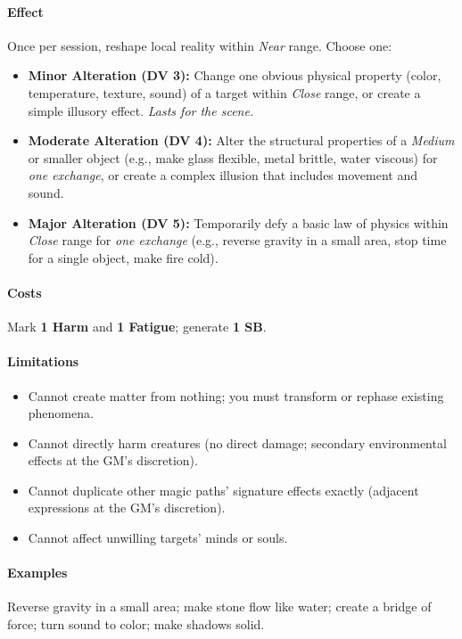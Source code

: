 \documentclass[11pt,twoside]{article}
\begin{document}
\paragraph*{Effect} Once per session, reshape local reality within \emph{Near} range. Choose one:
\begin{itemize}
  \item \textbf{Minor Alteration (DV 3):} Change one obvious physical property (color, temperature, texture, sound) of a target within \emph{Close} range, or create a simple illusory effect. \emph{Lasts for the scene.}
  \item \textbf{Moderate Alteration (DV 4):} Alter the structural properties of a \emph{Medium} or smaller object (e.g., make glass flexible, metal brittle, water viscous) for \emph{one exchange}, or create a complex illusion that includes movement and sound.
  \item \textbf{Major Alteration (DV 5):} Temporarily defy a basic law of physics within \emph{Close} range for \emph{one exchange} (e.g., reverse gravity in a small area, stop time for a single object, make fire cold).
\end{itemize}

\paragraph*{Costs} Mark \textbf{1 Harm} and \textbf{1 Fatigue}; generate \textbf{1 SB}.

\paragraph*{Limitations}
\begin{itemize}
  \item Cannot create matter from nothing; you must transform or rephase existing phenomena.
  \item Cannot directly harm creatures (no direct damage; secondary environmental effects at the GM's discretion).
  \item Cannot duplicate other magic paths' signature effects exactly (adjacent expressions at the GM's discretion).
  \item Cannot affect unwilling targets' minds or souls.
\end{itemize}

\paragraph*{Examples} Reverse gravity in a small area; make stone flow like water; create a bridge of force; turn sound to color; make shadows solid.
\end{document}
